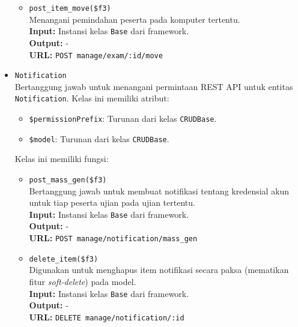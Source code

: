 \begin{itemize}
\begin{itemize}
                \item \texttt{post\_item\_move(\$f3)} \\
                    Menangani pemindahan peserta pada komputer tertentu.\\
                    \textbf{Input:} Instansi kelas \texttt{Base} dari framework.\\
                    \textbf{Output:} -\\
                    \textbf{URL:} \texttt{POST manage/exam/:id/move}
            \end{itemize}
        
        \item \texttt{Notification}\\
            Bertanggung jawab untuk menangani permintaan REST API untuk entitas 
            \texttt{Notification}. 
            Kelas ini memiliki atribut:
            \begin{itemize}
                \item \texttt{\$permissionPrefix}: Turunan dari kelas \texttt{CRUDBase}.
                \item \texttt{\$model}: Turunan dari kelas \texttt{CRUDBase}.
            \end{itemize}
            Kelas ini memiliki fungsi:
            \begin{itemize}
                \item \texttt{post\_mass\_gen(\$f3)} \\
                    Bertanggung jawab untuk membuat notifikasi tentang kredensial akun
                    untuk tiap peserta ujian pada ujian tertentu. \\
                    \textbf{Input:} Instansi kelas \texttt{Base} dari framework.\\
                    \textbf{Output:} -\\
                    \textbf{URL:} \texttt{POST manage/notification/mass\_gen}
                
                \item \texttt{delete\_item(\$f3)} \\
                    Digunakan untuk menghapus item notifikasi secara paksa (mematikan fitur 
                    \textit{soft-delete}) pada model. \\
                    \textbf{Input:} Instansi kelas \texttt{Base} dari framework.\\
                    \textbf{Output:} -\\
                    \textbf{URL:} \texttt{DELETE manage/notification/:id}
                

\end{itemize}
\end{itemize}
